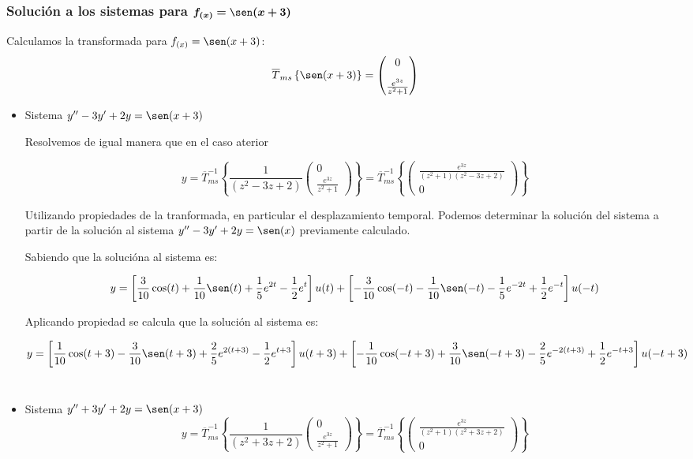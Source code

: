 \documentclass[12pt]{article}
\begin{document}

\subsubsection{Solución a los sistemas para $\bm{ f_{(x)}=\sen(x+3)}$}

Calculamos la transformada para $f_{(x)}=\sen(x+3)$:
$$
\overline{T}_{ms}\left\{\sen(x+3)\right\} = \begin{pmatrix}
0\\[0.3cm]
\frac{e^{3z}}{z^2+1} 
\end{pmatrix}
$$
\begin{itemize}

\item Sistema $y'' - 3 y' +2y=\sen(x+3)$

Resolvemos de igual manera que en el caso aterior

$$
y=\overline{T}_{ms}^{-1}\left\{ \frac{1}{\left( z^2 - 3z + 2\right) }  \begin{pmatrix}
0\\[0.3cm]
\frac{ e^{3z}}{z^2+1}
\end{pmatrix}\right\} = \overline{T}_{ms}^{-1}\left\{   \begin{pmatrix}
\frac{e^{3z}}{(z^2+1)( z^2 - 3z + 2)}\\[0.3cm]
0
\end{pmatrix}\right\} 
$$

Utilizando propiedades de la tranformada, en particular el desplazamiento temporal. Podemos determinar la solución del sistema a partir de la solución al sistema \mbox{$y'' - 3 y' +2y=\sen(x)$} previamente calculado.

Sabiendo que la solucióna al sistema es:
{\footnotesize

$$y= \left[\frac{3}{10}\cos(t)+\frac{1}{10}\sen(t)+\frac{1}{5} e^{2t}-\frac{1}{2} e^t\right] u(t)+ \left[- \frac{3}{10} \cos(-t)-\frac{1}{10}\sen(-t) -\frac{1}{5} e^{-2t} + \frac{1}{2} e^{-t}\right] u(-t)$$
}

Aplicando propiedad se calcula que la solución al sistema es:


{\tiny
$$y= \left[\frac{1}{10}\cos(t+3)-\frac{3}{10}\sen(t+3)+\frac{2}{5} e^{2(t+3)}-\frac{1}{2} e^{t+3}\right] u(t+3)+ \left[-\frac{1}{10}\cos(-t+3)+\frac{3}{10}\sen(-t+3)-\frac{2}{5} e^{-2(t+3)}+\frac{1}{2} e^{-t+3}\right]  u(-t+3)$$
}\\



\item Sistema $y'' + 3 y' +2y=\sen(x+3)$
$$
y=\overline{T}_{ms}^{-1}\left\{ \frac{1}{\left( z^2 + 3z + 2\right) }  \begin{pmatrix}
0\\[0.3cm]
\frac{ e^{3z}}{z^2+1}
\end{pmatrix}\right\} = \overline{T}_{ms}^{-1}\left\{   \begin{pmatrix}
\frac{e^{3z}}{(z^2+1)( z^2 + 3z + 2)}\\[0.3cm]
0
\end{pmatrix}\right\} 
$$


\end{itemize}
\end{document}

